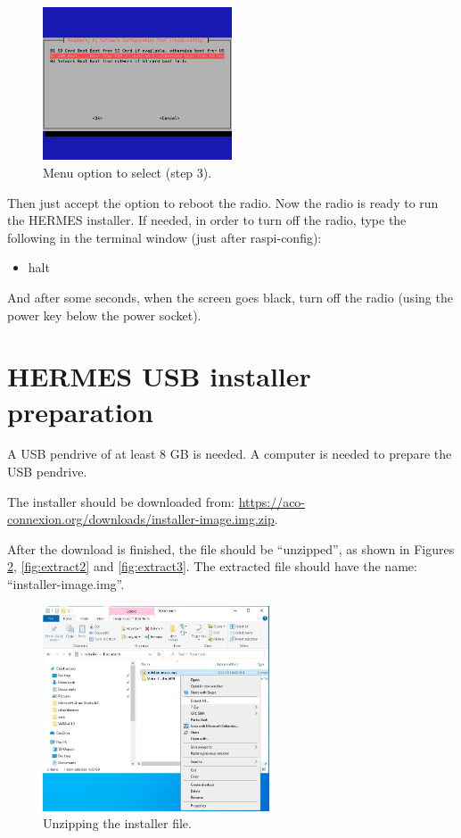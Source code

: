\documentclass[11pt,a4paper]{article}
\begin{document}
\begin{figure}[H]
  \centering
  \includegraphics[width=0.5\textwidth]{pictures/screen6.jpg}
  \caption{Menu option to select (step 3).}
  \label{fig:screen6}
\end{figure}

Then just accept the option to reboot the radio.
Now the radio is ready to run the HERMES installer. If needed, in order to turn off the radio, type the following in the terminal window (just after raspi-config):

\begin{itemize}
\item halt
\end{itemize}

And after some seconds, when the screen goes black, turn off the radio (using the power key below the power socket).

\section{HERMES USB installer preparation}

A USB pendrive of at least 8 GB is needed. A computer is needed to prepare the USB pendrive.

The installer should be downloaded from: \url{https://aco-connexion.org/downloads/installer-image.img.zip}.

After the download is finished, the file should be ``unzipped'', as shown in Figures \ref{fig:extract1}, \ref{fig:extract2}
and \ref{fig:extract3}.
The extracted file should have the name: ``installer-image.img''.

\begin{figure}[H]
  \centering
  \includegraphics[width=0.6\textwidth]{pictures/extract-1-ed.jpg}
  \caption{Unzipping the installer file.}
  \label{fig:extract1}
\end{figure}
\end{document}
